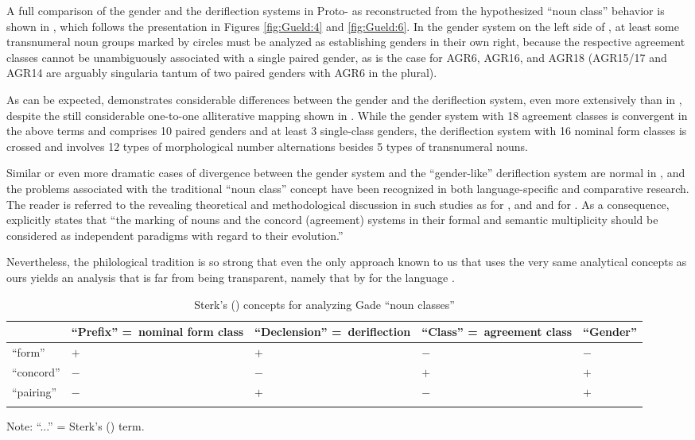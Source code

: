 \documentclass[output=collectionpaper]{langsci/langscibook}
\begin{document}
A full comparison of the gender and the deriflection systems in Proto- as reconstructed from the hypothesized ``noun class'' behavior is shown in , which follows the presentation in Figures \ref{fig:Gueld:4} and \ref{fig:Gueld:6}. In the gender system on the left side of , at least some transnumeral noun groups marked by circles must be analyzed as establishing genders in their own right, because the respective agreement classes cannot be unambiguously associated with a single paired gender, as is the case for AGR6, AGR16, and AGR18 (AGR15/17 and AGR14 are arguably singularia tantum of two paired genders with AGR6 in the plural).

As can be expected,  demonstrates considerable differences between the gender and the deriflection system, even more extensively than in , despite the still considerable one-to-one alliterative mapping shown in . While the gender system with 18 agreement classes is convergent in the above terms and comprises 10 paired genders and at least 3 single-class genders, the deriflection system with 16 nominal form classes is crossed and involves 12 types of morphological number alternations besides 5 types of transnumeral nouns.


Similar or even more dramatic cases of divergence between the gender system and the ``gender-like'' deriflection system are normal in , and the problems associated with the traditional ``noun class'' concept have been recognized in both language-specific and comparative research. The reader is referred to the revealing theoretical and methodological discussion in such studies as \citet{Guthrie1948} for , and \citet{Voorhoeve1969} and \citet{DeWolf1971} for . As a consequence, \citet[33f]{Mieheforthcoming} explicitly states that ``the marking of nouns and the concord (agreement) systems in their formal and semantic multiplicity should be considered as independent paradigms with regard to their evolution.''

Nevertheless, the philological tradition is so strong that even the only approach known to us that uses the very same analytical concepts as ours yields an analysis that is far from being transparent, namely that by \citet{Sterk1978} for the  language .

\begin{table}[b]
\begin{tabularx}{\textwidth}{XQXQX}
\lsptoprule
& ``Prefix'' =~nominal form class & ``Declension'' =~deriflection & ``Class'' =~agreement class & ``Gender''\\
\midrule
``form'' & $+$ & $+$ & $-$ & $-$\\
``concord'' & $-$ & $-$ & $+$ & $+$\\
``pairing'' & $-$ & $+$ & $-$ & $+$\\
\lspbottomrule
\end{tabularx}
{\small Note: ``...'' = Sterk's (\citeyear{Sterk1978}) term.}

\caption{Sterk's (\citeyear[25]{Sterk1978}) concepts for analyzing Gade ``noun classes''}
\label{tab:Gueld:3}
\end{table}
\end{document}
